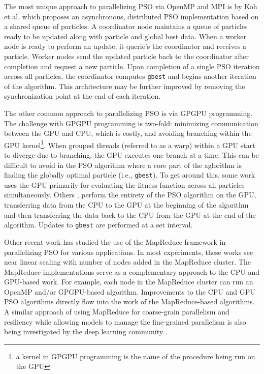 The most unique approach to parallelizing PSO via OpenMP and MPI is by Koh et
al. \cite{papso} which proposes an asynchronous, distributed PSO implementation
based on a shared queue of particles. A coordinator node maintains a queue of
particles ready to be updated along with particle and global best data. When a
worker node is ready to perform an update, it querie's the coordinator and
receives a particle. Worker nodes send the updated particle back to the
coordinator after completion and request a new particle. Upon completion of a
single PSO iteration across all particles, the coordinator computes
\texttt{gbest} and begins another iteration of the algorithm. This architecture
may be further improved by removing the synchronization point at the end of each
iteration. 

The other common approach to parallelizing PSO is via GPGPU programming. The
challenge with GPGPU programming is two-fold: minimizing communication between
the GPU and CPU, which is costly, and avoiding branching within the GPU
kernel\footnote{a kernel in GPGPU programming is the name of the procedure being
  run on  the GPU}. When grouped threads (referred to as a warp) within a GPU
start to diverge due to branching, the
GPU executes one branch at a time.
This can be difficult to avoid in the PSO algorithm where a core part
of the aglorithm is finding the globally optimal particle (i.e., \texttt{gbest}).
To get around this,
some work \cite{gpu-ppso, gpu-pso, biopsogpu} uses the GPU primarily for evaluating the
fitness function across all particles simultaneously.
Others \cite{swarmgrid, multiswarmpso-gpu}, perform the entirety of
the PSO algorithm on the GPU, transferring data from the CPU to the GPU at the
beginning of the algorithm and then transferring the data back to the CPU from
the GPU at the end of the algorithm. Updates to \texttt{gbest} are performed at
a set interval.

Other recent work \cite{mrcpso, mprso, coop-pso, intrusion-pso} has
studied the use of the MapReduce framework \cite{mapreduce} in parallelizing PSO
for various applications. In most experiments, these works see near linear
scaling with number of nodes added in the MapReduce cluster.
The MapReduce implementations serve as a complementary
approach to the CPU and GPU-based work. For example, each node in the MapReduce
cluster can run an OpenMP and/or
GPGPU-based algorithm. Improvements to the CPU and GPU PSO algorithms directly
flow into the work of the MapReduce-based algorithms. A similar approach of using
MapReduce for coarse-grain parallelism and resiliency while allowing
models to manage the fine-grained
parallelism is also being investigated by the deep learning community \cite{mrpnn,
  heterospark, dlspark}. 

